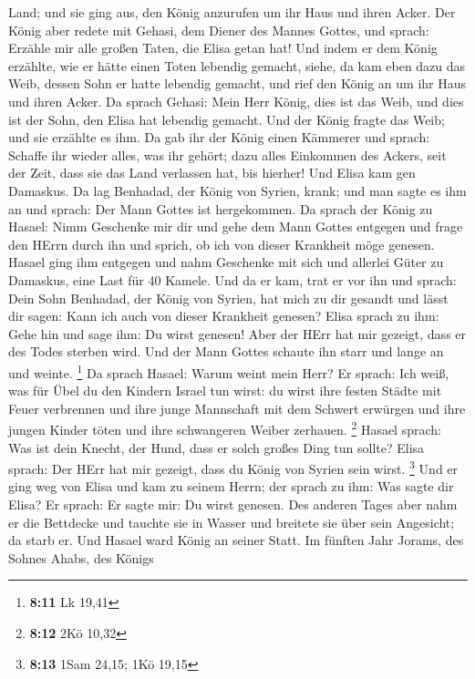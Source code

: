 Land; und sie ging aus, den König anzurufen um ihr Haus und ihren Acker.
 Der König aber redete mit Gehasi, dem Diener des Mannes
Gottes, und sprach: Erzähle mir alle großen Taten, die Elisa getan hat!
 Und indem er dem König erzählte, wie er hätte einen Toten
lebendig gemacht, siehe, da kam eben dazu das Weib, dessen Sohn er hatte
lebendig gemacht, und rief den König an um ihr Haus und ihren Acker. Da
sprach Gehasi: Mein Herr König, dies ist das Weib, und dies ist der
Sohn, den Elisa hat lebendig gemacht.  Und der König fragte
das Weib; und sie erzählte es ihm. Da gab ihr der König einen Kämmerer
und sprach: Schaffe ihr wieder alles, was ihr gehört; dazu alles
Einkommen des Ackers, seit der Zeit, dass sie das Land verlassen hat,
bis hierher!  Und Elisa kam gen Damaskus. Da lag Benhadad,
der König von Syrien, krank; und man sagte es ihm an und sprach: Der
Mann Gottes ist hergekommen.  Da sprach der König zu Hasael:
Nimm Geschenke mir dir und gehe dem Mann Gottes entgegen und frage den
HErrn durch ihn und sprich, ob ich von dieser Krankheit möge genesen.
 Hasael ging ihm entgegen und nahm Geschenke mit sich und
allerlei Güter zu Damaskus, eine Last für 40 Kamele. Und da er kam, trat
er vor ihn und sprach: Dein Sohn Benhadad, der König von Syrien, hat
mich zu dir gesandt und lässt dir sagen: Kann ich auch von dieser
Krankheit genesen?  Elisa sprach zu ihm: Gehe hin und sage
ihm: Du wirst genesen! Aber der HErr hat mir gezeigt, dass er des Todes
sterben wird.  Und der Mann Gottes schaute ihn starr und
lange an und weinte. \footnote{\textbf{8:11} Lk 19,41}  Da
sprach Hasael: Warum weint mein Herr? Er sprach: Ich weiß, was für Übel
du den Kindern Israel tun wirst: du wirst ihre festen Städte mit Feuer
verbrennen und ihre junge Mannschaft mit dem Schwert erwürgen und ihre
jungen Kinder töten und ihre schwangeren Weiber zerhauen. \footnote{\textbf{8:12}
  2Kö 10,32}  Hasael sprach: Was ist dein Knecht, der Hund,
dass er solch großes Ding tun sollte? Elisa sprach: Der HErr hat mir
gezeigt, dass du König von Syrien sein wirst. \footnote{\textbf{8:13}
  1Sam 24,15; 1Kö 19,15}  Und er ging weg von Elisa und kam
zu seinem Herrn; der sprach zu ihm: Was sagte dir Elisa? Er sprach: Er
sagte mir: Du wirst genesen.  Des anderen Tages aber nahm
er die Bettdecke und tauchte sie in Wasser und breitete sie über sein
Angesicht; da starb er. Und Hasael ward König an seiner Statt.
 Im fünften Jahr Jorams, des Sohnes Ahabs, des Königs
